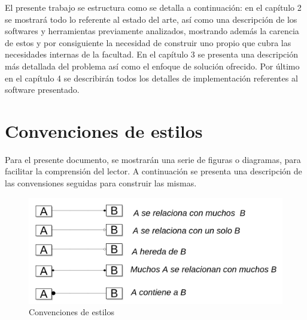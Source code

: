 El presente trabajo se estructura como se detalla a continuación: en el capítulo 2 se mostrará todo lo referente al estado del arte, así como una descripción de los softwares y herramientas previamente analizados, mostrando además la carencia de estos y por consiguiente la necesidad de construir uno propio que cubra las necesidades internas de la facultad. En el capítulo 3 se presenta una descripción más detallada del problema así como el enfoque de solución ofrecido. Por último en el capítulo 4 se describirán todos los detalles de implementación referentes al software presentado.
	
\section{Convenciones de estilos}
	
Para el presente documento, se mostrarán una serie de figuras o diagramas, para facilitar la comprensión del lector. A continuación se presenta una descripción de las convensiones seguidas para construir las mismas.
	
\begin{figure}[h!]
	\centering
	\includegraphics[width=1\linewidth]{images/Introduction/style_conventions}
	\caption{Convenciones de estilos}
	\label{fig:style_conventions}
\end{figure}
	
	

